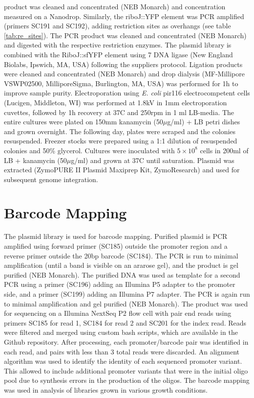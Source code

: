product was cleaned and concentrated (NEB Monarch) and concentration measured on a Nanodrop. Similarly, the riboJ::YFP element was PCR amplified (primers SC191 and SC192), adding restriction sites as overhangs (see table \ref{tab:re_sites}). The PCR product was cleaned and concentrated (NEB Monarch) and digested with the respective restriction enzymes. The plasmid library is combined with the RiboJ::sfYFP element using 7 DNA ligase (New England Biolabs, Ipswich, MA, USA) following the suppliers protocol. Ligation products were cleaned and concentrated (NEB Monarch) and drop dialysis (MF-Millipore VSWP02500, MilliporeSigma, Burlington, MA, USA)  was performed for 1h to improve sample purity. Electroporation using \textit{E. coli} pir116 electrocompetent cells (Lucigen, Middleton, WI) was performed at 1.8kV in 1mm electroporation cuvettes, followed by 1h recovery at 37C and 250rpm in 1 ml LB-media. The entire cultures were plated on 150mm kanamycin (50$\mu$g/ml) + LB petri dishes and grown overnight. The following day, plates were scraped and the colonies resuspended. Freezer stocks were prepared using a 1:1 dilution of resuspended colonies and 50\% glycerol. Cultures were inoculated with $5\times 10^8$ cells in 200ml of LB + kanamycin (50$\mu$g/ml) and grown at 37C until saturation. Plasmid was extracted (ZymoPURE II Plasmid Maxiprep Kit, ZymoResearch) and used for subsequent genome integration. 


\section{Barcode Mapping}
\label{sec:barcode_mapping}
The plasmid library is used for barcode mapping. Purified plasmid is PCR amplified using forward primer (SC185) outside the promoter region and a reverse primer outside the 20bp barcode (SC184). The PCR is run to minimal amplification (until a band is visible on an ararose gel), and the product is gel purified (NEB Monarch). The purified DNA was used as template for a second PCR using a primer (SC196) adding an Illumina P5 adapter to the promoter side, and a primer (SC199) adding an Illumina P7 adapter. The PCR is again run to minimal amplification and gel purified (NEB Monarch). The product was used for sequencing on a Illumina NextSeq P2 flow cell with pair end reads using primers SC185 for read 1, SC184 for read 2 and SC201 for the index read. Reads were filtered and merged using custom bash scripts, which are available in the Github repository. After processing, each promoter/barcode pair was identified in each read, and pairs with less than 3 total reads were discarded. An alignment algorithm was used to identify the identity of each sequenced promoter variant. This allowed to include additional promoter variants that were in the initial oligo pool due to synthesis errors in the production of the oligos. The barcode mapping was used in analysis of libraries grown in various growth conditions.

